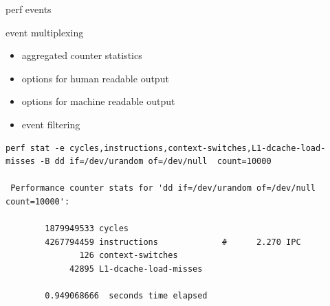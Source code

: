 \begin{frame}{perf events}
\begin{itemize}
\end{itemize}
\end{frame}

\begin{frame}{event multiplexing}
\begin{itemize}
\end{itemize}
\end{frame}

\begin{frame}[fragile]{}
\begin{itemize}
  \item aggregated counter statistics
  \item options for human readable output
  \item options for machine readable output
  \item event filtering
\end{itemize}
\pause
\begin{lstlisting}[basicstyle=\tiny\ttfamily]
perf stat -e cycles,instructions,context-switches,L1-dcache-load-misses -B dd if=/dev/urandom of=/dev/null  count=10000

 Performance counter stats for 'dd if=/dev/urandom of=/dev/null count=10000':

        1879949533 cycles                  
        4267794459 instructions             #      2.270 IPC  
               126 context-switches        
             42895 L1-dcache-load-misses   

        0.949068666  seconds time elapsed
\end{lstlisting}
\end{frame}

